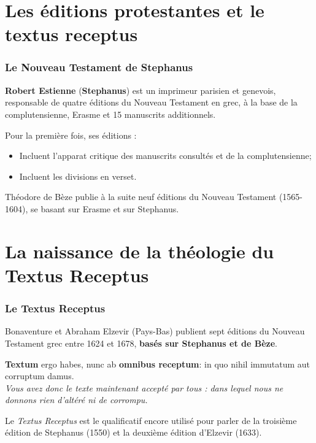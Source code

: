 \documentclass[11pt]{beamer}
\begin{document}
\section{Les éditions protestantes et le textus receptus}

\begin{frame}
  \frametitle{Le Nouveau Testament de Stephanus}
\begin{alertblock}{}
    \textbf{Robert Estienne} (\textbf{Stephanus}) est un imprimeur parisien et genevois, responsable de quatre éditions du Nouveau Testament en grec, à la base de la complutensienne, Erasme et 15 manuscrits additionnels.
\end{alertblock}
Pour la première fois, ses éditions :
\begin{itemize}
    \item Incluent l'apparat critique des manuscrits consultés et de la complutensienne;
    \item Incluent les divisions en verset.
\end{itemize}
\begin{block}{}
Théodore de Bèze publie à la suite neuf éditions du Nouveau Testament (1565-1604), se basant sur Erasme et sur Stephanus.
\end{block}
\end{frame}


\section{La naissance de la théologie du Textus Receptus}

\begin{frame}
  \frametitle{Le Textus Receptus}

Bonaventure et Abraham Elzevir (Pays-Bas) publient sept éditions du Nouveau Testament grec entre 1624 et 1678, \textbf{basés sur Stephanus et de Bèze}.

\begin{exampleblock}{}
\textbf{Textum} ergo habes, nunc ab \textbf{omnibus receptum}: in quo nihil immutatum aut corruptum damus. \\
\textit{Vous avez donc le texte maintenant accepté par tous : dans lequel nous ne donnons rien d'altéré ni de corrompu.}
\end{exampleblock}
  Le \emph{Textus Receptus} est le qualificatif encore utilisé pour parler de la troisième édition de Stephanus (1550) et la deuxième édition d'Elzevir (1633).
\end{frame}
\end{document}
